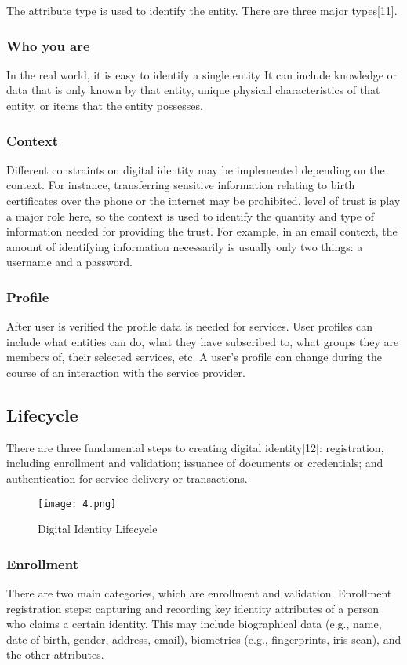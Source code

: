  The attribute type is used to identify the entity. There are three major types[11].

 \subsubsection{Who you are}
 In the real world, it is easy to identify a single entity  It can include knowledge or data that is only known by that entity, unique physical characteristics of that entity, or items that the entity possesses.

 \subsubsection{Context}
 Different constraints on digital identity may be implemented depending on the context. For instance, transferring sensitive information relating to birth certificates over the phone or the internet may be prohibited. level of trust is play a major role here, so the context is used to identify the quantity and type of information needed for providing the trust. For example, in an email context, the amount of identifying information necessarily is usually only two things: a username and a password. 

 \subsubsection{Profile}
 After user is verified the profile data is needed for services. User profiles can include what entities can do, what they have subscribed to, what groups they are members of, their selected services, etc. A user’s profile can change during the course of an interaction with the service provider.

\subsection{Lifecycle}
There are three fundamental steps to creating digital identity[12]: registration, including enrollment and validation; issuance of documents or credentials; and authentication for service delivery or transactions.

\begin{figure}[H]
    \centering
    \texttt{[image: 4.png]}
    \caption{Digital Identity Lifecycle}
    \label{fig:threshold}
  \end{figure}

  \subsubsection{Enrollment}
  There are two main categories, which are enrollment and validation. Enrollment registration steps: capturing and recording key identity attributes of a person who claims a certain identity. This may include biographical data (e.g., name, date of birth, gender, address, email), biometrics (e.g., fingerprints, iris scan), and the other attributes. 
  
